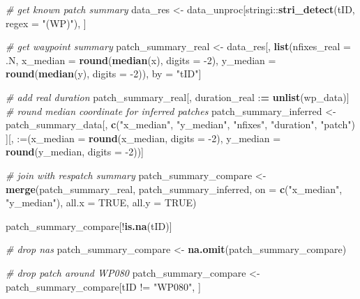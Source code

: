 \documentclass[
]{scrreprt}
\newenvironment{Shaded}{}{}
\newcommand{\CommentTok}[1]{\textcolor[rgb]{0.38,0.63,0.69}{\textit{#1}}}
\newcommand{\DataTypeTok}[1]{\textcolor[rgb]{0.56,0.13,0.00}{#1}}
\newcommand{\DecValTok}[1]{\textcolor[rgb]{0.25,0.63,0.44}{#1}}
\newcommand{\ErrorTok}[1]{\textcolor[rgb]{1.00,0.00,0.00}{\textbf{#1}}}
\newcommand{\KeywordTok}[1]{\textcolor[rgb]{0.00,0.44,0.13}{\textbf{#1}}}
\newcommand{\NormalTok}[1]{#1}
\newcommand{\OperatorTok}[1]{\textcolor[rgb]{0.40,0.40,0.40}{#1}}
\newcommand{\OtherTok}[1]{\textcolor[rgb]{0.00,0.44,0.13}{#1}}
\newcommand{\StringTok}[1]{\textcolor[rgb]{0.25,0.44,0.63}{#1}}
\begin{document}
\begin{Shaded}
\begin{Highlighting}[]
\CommentTok{\# get known patch summary}
\NormalTok{data\_res <{-}}\StringTok{ }\NormalTok{data\_unproc[stringi}\OperatorTok{::}\KeywordTok{stri\_detect}\NormalTok{(tID, }\DataTypeTok{regex =} \StringTok{"(WP)"}\NormalTok{), ]}

\CommentTok{\# get waypoint summary}
\NormalTok{patch\_summary\_real <{-}}\StringTok{ }\NormalTok{data\_res[, }\KeywordTok{list}\NormalTok{(}\DataTypeTok{nfixes\_real =}\NormalTok{ .N,}
                                      \DataTypeTok{x\_median =} \KeywordTok{round}\NormalTok{(}\KeywordTok{median}\NormalTok{(x), }\DataTypeTok{digits =} \DecValTok{{-}2}\NormalTok{),}
                                      \DataTypeTok{y\_median =} \KeywordTok{round}\NormalTok{(}\KeywordTok{median}\NormalTok{(y), }\DataTypeTok{digits =} \DecValTok{{-}2}\NormalTok{)), }
\NormalTok{                               by =}\StringTok{ "tID"}\NormalTok{]}

\CommentTok{\# add real duration}
\NormalTok{patch\_summary\_real[, duration\_real }\OperatorTok{:}\ErrorTok{=}\StringTok{ }\KeywordTok{unlist}\NormalTok{(wp\_data)]}
\CommentTok{\# round median coordinate for inferred patches}
\NormalTok{patch\_summary\_inferred <{-}}\StringTok{ }
\StringTok{  }\NormalTok{patch\_summary\_data[, }
                     \KeywordTok{c}\NormalTok{(}\StringTok{"x\_median"}\NormalTok{, }\StringTok{"y\_median"}\NormalTok{, }
                       \StringTok{"nfixes"}\NormalTok{, }\StringTok{"duration"}\NormalTok{, }\StringTok{"patch"}\NormalTok{)}
\NormalTok{                     ][, }\StringTok{\textasciigrave{}}\DataTypeTok{:=}\StringTok{\textasciigrave{}}\NormalTok{(}\DataTypeTok{x\_median =} \KeywordTok{round}\NormalTok{(x\_median, }\DataTypeTok{digits =} \DecValTok{{-}2}\NormalTok{),}
                              \DataTypeTok{y\_median =} \KeywordTok{round}\NormalTok{(y\_median, }\DataTypeTok{digits =} \DecValTok{{-}2}\NormalTok{))]}

\CommentTok{\# join with respatch summary}
\NormalTok{patch\_summary\_compare <{-}}\StringTok{ }
\StringTok{  }\KeywordTok{merge}\NormalTok{(patch\_summary\_real,}
\NormalTok{        patch\_summary\_inferred, }
        \DataTypeTok{on =} \KeywordTok{c}\NormalTok{(}\StringTok{"x\_median"}\NormalTok{, }\StringTok{"y\_median"}\NormalTok{),}
        \DataTypeTok{all.x =} \OtherTok{TRUE}\NormalTok{, }\DataTypeTok{all.y =} \OtherTok{TRUE}\NormalTok{)}

\NormalTok{patch\_summary\_compare[}\OperatorTok{!}\KeywordTok{is.na}\NormalTok{(tID)]}

\CommentTok{\# drop nas}
\NormalTok{patch\_summary\_compare <{-}}\StringTok{ }\KeywordTok{na.omit}\NormalTok{(patch\_summary\_compare)}

\CommentTok{\# drop patch around WP080}
\NormalTok{patch\_summary\_compare <{-}}\StringTok{ }\NormalTok{patch\_summary\_compare[tID }\OperatorTok{!=}\StringTok{ "WP080"}\NormalTok{, ]}
\end{Highlighting}
\end{Shaded}
\end{document}
